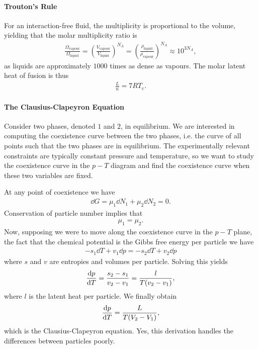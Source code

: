 \paragraph{Trouton's Rule}
For an interaction-free fluid, the multiplicity is proportional to the volume, yielding that the molar multiplicity ratio is
\begin{align*}
	\frac{\Omega_{\text{vapour}}}{\Omega_{\text{liquid}}} = \left(\frac{V_{\text{vapour}}}{V_{\text{liquid}}}\right)^{N_{A}} = \left(\frac{\rho_{\text{liquid}}}{\rho_{\text{vapour}}}\right)^{N_{A}} \approx 10^{3N_{A}},
\end{align*}
as liquids are approximately $1000$ times as dense as vapours. The molar latent heat of fusion is thus
\begin{align*}
	\frac{L}{n} = 7RT_{\text{c}}.
\end{align*}

\paragraph{The Clausius-Clapeyron Equation}
Consider two phases, denoted $1$ and $2$, in equilibrium. We are interested in computing the coexistence curve between the two phases, i.e. the curve of all points such that the two phases are in equilibrium. The experimentally relevant constraints are typically constant pressure and temperature, so we want to study the coexistence curve in the $p-T$ diagram and find the coexistence curve when these two variables are fixed.

At any point of coexistence we have
\begin{align*}
	\dd{G} = \mu_{1}\dd{N_{1}} + \mu_{2}\dd{N_{2}} = 0.
\end{align*}
Conservation of particle number implies that
\begin{align*}
	\mu_{1} = \mu_{2}.
\end{align*}
Now, supposing we were to move along the coexistence curve in the $p-T$ plane, the fact that the chemical potential is the Gibbs free energy per particle we have
\begin{align*}
	-s_{1}\dd{T} + v_{1}\dd{p} = -s_{2}\dd{T} + v_{2}\dd{p}
\end{align*}
where $s$ and $v$ are entropies and volumes per particle. Solving this yields
\begin{align*}
	\dv{p}{T} = \frac{s_{2} - s_{1}}{v_{2} - v_{1}} = \frac{l}{T(v_{2} - v_{1})},
\end{align*}
where $l$ is the latent heat per particle. We finally obtain
\begin{align*}
	\dv{p}{T} = \frac{L}{T(V_{2} - V_{1})},
\end{align*}
which is the Clausius-Clapeyron equation. Yes, this derivation handles the differences between particles poorly.